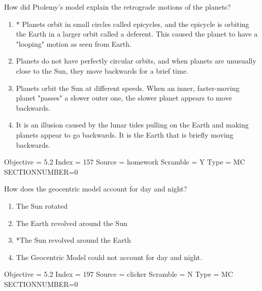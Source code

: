 \documentclass[11pt]{article}
\begin{document}
\begin{enumerate}
\begin{minipage}{\textwidth}
\begin{minipage}{\textwidth}
\item How did Ptolemy's model explain the retrograde motions of the planets?
\begin{enumerate} 
\setlength{\itemsep}{1pt} 
\setlength{\parskip}{0pt} 
\setlength{\parsep}{0pt}
\setlength{\multicolsep}{1pt} 
\item * Planets orbit in small circles called epicycles, and the epicycle is orbiting the Earth in a larger orbit called a deferent. This caused the planet to have a "looping" motion as seen from Earth.
\item  Planets do not have perfectly circular orbits, and when planets are unusually close to the Sun, they move backwards for a brief time.
\item  Planets orbit the Sun at different speeds. When an inner, faster-moving planet "passes" a slower outer one, the slower planet appears to move backwards.
\item  It is an illusion caused by the lunar tides pulling on the Earth and making planets appear to go backwards. It is the Earth that is briefly moving backwards.
\end{enumerate} 
Objective = 5.2
Index = 157
Source = homework
Scramble = Y
Type = MC
SECTIONNUMBER=0
\end{minipage}
\end{minipage}
\vskip 0.20in

\begin{minipage}{\textwidth}
\begin{minipage}{\textwidth}
\item How does the geocentric model account for day and night?
\begin{enumerate} 
\setlength{\itemsep}{1pt} 
\setlength{\parskip}{0pt} 
\setlength{\parsep}{0pt}
\setlength{\multicolsep}{1pt} 
\item The Sun rotated
\item The Earth revolved around the Sun
\item *The Sun revolved around the Earth
\item The Geocentric Model could not account for day and night.
\end{enumerate} 
Objective = 5.2
Index = 197
Source = clicker
Scramble = N
Type = MC
SECTIONNUMBER=0
\end{minipage}
\end{minipage}
\vskip 0.20in


\end{enumerate}
\end{document}
